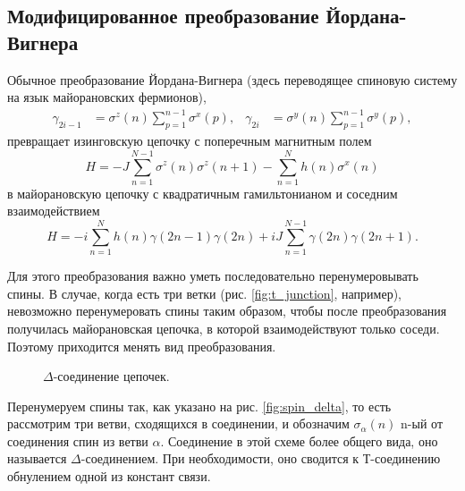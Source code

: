 \documentclass[a4paper,12pt]{article}
\theoremstyle{plain} %
\theoremstyle{definition} %
\theoremstyle{remark} %
\begin{document}
\subsection{Модифицированное преобразование Йордана-Вигнера}

Обычное преобразование Йордана-Вигнера (здесь переводящее спиновую систему на язык майорановских фермионов),
\begin{align}
\gamma_{2i-1} &= \sigma^z (n) \sum\limits_{p=1}^{n-1} \sigma^x (p), & 
\gamma_{2i} &= \sigma^y (n) \sum\limits_{p=1}^{n-1} \sigma^y (p),
\end{align}
превращает изинговскую цепочку с поперечным магнитным полем
\begin{equation}
H = - J \sum\limits_{n=1}^{N-1} \sigma^z(n) \sigma^z(n+1) - \sum\limits_{n=1}^N h(n) \sigma^x(n)
\label{eq:spin_H}
\end{equation}
в майорановскую цепочку с квадратичным гамильтонианом и соседним взаимодействием
\begin{equation}
H = -i \sum\limits_{n=1}^N h(n) \gamma(2n-1) \gamma(2n) + i J \sum\limits_{n=1}^{N-1} \gamma(2n) \gamma(2n+1).
\end{equation}

Для этого преобразования важно уметь последовательно перенумеровывать спины. В случае, когда есть три ветки (рис. \ref{fig:t_junction}, например), невозможно перенумеровать спины таким образом, чтобы после преобразования получилась майорановская цепочка, в которой взаимодействуют только соседи. Поэтому приходится менять вид преобразования.

\begin{figure}
    \centering
    \captionsetup{width=0.45\textwidth}
    \caption{$\Delta$-соединение цепочек.}
\end{figure}

Перенумеруем спины так, как указано на рис. \ref{fig:spin_delta}, то есть рассмотрим три ветви, сходящихся в соединении, и обозначим $\sigma_\alpha (n)$ n-ый от соединения спин из ветви $\alpha$. Соединение в этой схеме более общего вида, оно называется $\Delta$-соединением. При необходимости, оно сводится к Т-соединению обнулением одной из констант связи.
\end{document}
